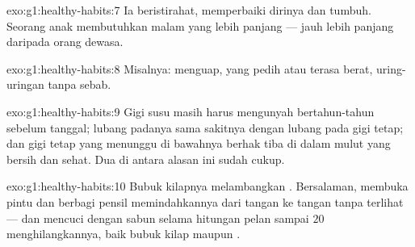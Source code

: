 \begin{solution}{exo:g1:healthy-habits:7}
Ia beristirahat, memperbaiki dirinya dan tumbuh. Seorang anak
membutuhkan malam yang lebih panjang --- jauh lebih panjang daripada
orang dewasa.
\end{solution}

\begin{solution}{exo:g1:healthy-habits:8}
Misalnya: menguap,  yang pedih atau terasa berat, uring-uringan
tanpa sebab.
\end{solution}

\begin{solution}{exo:g1:healthy-habits:9}
Gigi susu masih harus mengunyah bertahun-tahun sebelum tanggal; lubang
padanya sama sakitnya dengan lubang pada gigi tetap; dan gigi tetap
yang menunggu di bawahnya berhak tiba di dalam mulut yang bersih dan
sehat. Dua di antara alasan ini sudah cukup.
\end{solution}

\begin{solution}{exo:g1:healthy-habits:10}
Bubuk kilapnya melambangkan . Bersalaman, membuka pintu dan
berbagi pensil memindahkannya dari tangan ke tangan tanpa terlihat ---
dan mencuci dengan sabun selama hitungan pelan sampai $20$
menghilangkannya, baik bubuk kilap maupun .
\end{solution}
